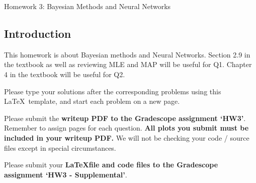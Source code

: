 \documentclass[submit]{harvardml}
\begin{document}
\begin{center}
{\Large Homework 3: Bayesian Methods and Neural Networks}\\
\end{center}

\subsection*{Introduction}

This homework is about Bayesian methods and Neural Networks.  Section 2.9 in the textbook as well as reviewing MLE and MAP will be useful for Q1. Chapter 4 in the textbook will be useful for Q2.

Please type your solutions after the corresponding problems using this
\LaTeX\ template, and start each problem on a new page.

Please submit the \textbf{writeup PDF to the Gradescope assignment `HW3'}. Remember to assign pages for each question.  \textbf{All plots you submit must be included in your writeup PDF.  }We will not be checking your code / source files except in special circumstances. 

Please submit your \textbf{\LaTeX file and code files to the Gradescope assignment `HW3 - Supplemental'}. 


\newpage
\end{document}
